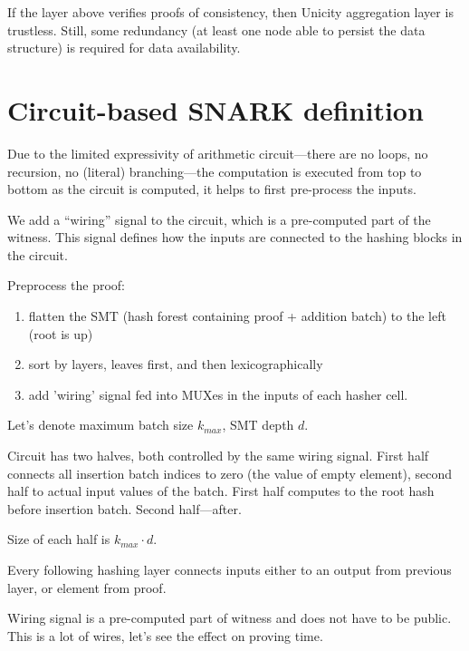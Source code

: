 \documentclass{llncs}
\begin{document}
If the layer above verifies proofs of consistency, then Unicity aggregation layer is trustless. Still, some redundancy (at least one node able to persist the data structure) is required for data availability.


\section{Circuit-based SNARK definition}

Due to the limited expressivity of arithmetic circuit---there are no loops, no recursion, no (literal) branching---the computation is executed from top to bottom as the circuit is computed, it helps to first pre-process the inputs.

We add a ``wiring'' signal to the circuit, which is a pre-computed part of the witness. This signal defines how the inputs are connected to the hashing blocks in the circuit.

Preprocess the proof:

\begin{enumerate}
    \item flatten the SMT (hash forest containing proof + addition batch) to the left (root is up)
    \item sort by layers, leaves first, and then lexicographically
    \item add 'wiring' signal fed into MUXes in the inputs of each hasher cell.
\end{enumerate}

Let's denote maximum batch size $k_{max}$, SMT depth $d$.

Circuit has two halves, both controlled by the same wiring signal. First half connects all insertion batch indices to zero (the value of empty element), second half to actual input values of the batch.
First half computes to the root hash before insertion batch. Second half---after.

Size of each half is $k_{max} \cdot d$.

Every following hashing layer connects inputs either to an output from previous layer, or element from proof.

Wiring signal is a pre-computed part of witness and does not have to be public. This is a lot of wires, let's see the effect on proving time.
\end{document}
